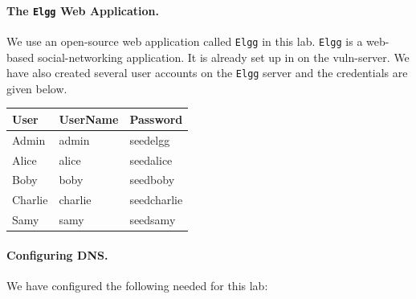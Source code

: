 \paragraph{The {\tt Elgg} Web Application.}
We use an open-source web application called {\tt Elgg} in this lab.
{\tt Elgg} is a web-based social-networking application. 
It is already set up in on the vuln-server.
We have also created several user accounts on the {\tt Elgg} server and the credentials are given below.


\vspace{0.1in}
\begin{tabular}{|l|l|l|}
\hline
User 	& UserName 	& Password\\
\hline
Admin 	& admin 	& seedelgg \\
Alice 	& alice 	& seedalice \\
Boby 	& boby 		& seedboby \\
Charlie & charlie 	& seedcharlie \\
Samy 	& samy 		& seedsamy \\
\hline
\end{tabular}
\vspace{0.1in}


\paragraph{Configuring DNS.}
We have configured the following \urlorurls needed for this lab: 
